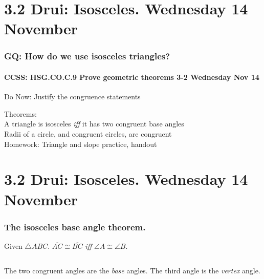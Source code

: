 \documentclass{beamer}
\begin{document}
\section{3.2 Drui: Isosceles. Wednesday 14 November}
  \frame
  {
    \frametitle{GQ: How do we use isosceles triangles?}
    \framesubtitle{CCSS: HSG.CO.C.9 Prove geometric theorems  \alert{3-2 Wednesday Nov 14}}

    \begin{block}{Do Now: Justify the congruence statements}
    \end{block}
    Theorems: \\
    A triangle is isosceles \emph{iff} it has two congruent base angles \\
    Radii of a circle, and congruent circles, are congruent\\[0.2cm]
    Homework: Triangle and slope practice, handout
    }



\section{3.2 Drui: Isosceles. Wednesday 14 November}
  \frame
  {
    \frametitle{The isosceles base angle theorem.}

  Given $\triangle ABC$. $\overline{AC} \cong \overline{BC}$ \emph{iff} $\angle A \cong \angle B$.\\[0.5cm]
  \begin{columns}
    \column{5cm}
    \column{4cm}
      The two congruent angles are the \emph{base} angles. The third angle is the \emph{vertex} angle.
  \end{columns}
  }
\end{document}
